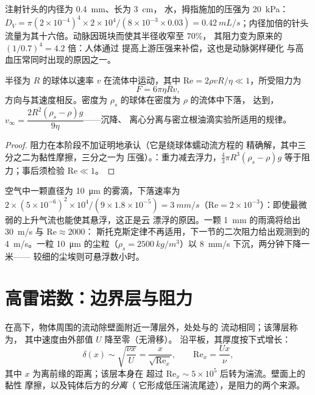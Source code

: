 \begin{example}[四次方]\label{ex:b2:viscous-flows:fourth}
注射针头的内径为 \qty{0.4}{mm}、长为 \qty{3}{cm}，
水，拇指施加的压强为 \qty{20}{kPa}：$D_V = \pi(2 \times 10^{-4})^4 \times 2 \times
10^4/(8 \times 10^{-3} \times 0.03) = \qty{0.42}{mL/s}$；内径加倍的针头
流量为其十六倍。动脉因斑块而使其半径收窄至 $70\%$，
其阻力变为原来的 $(1/0.7)^4 = 4.2$ 倍：人体通过
提高上游压强来补偿，这也是动脉粥样硬化
与高血压常同时出现的原因之一。
\end{example}

\begin{proposition}[斯托克斯阻力]\label{prop:b2:viscous-flows:stokes}
半径为 $R$ 的球体以速率 $v$ 在流体中运动，其中
$\mathrm{Re} = 2\rho vR/\eta \ll 1$，所受阻力为
\[
F = 6\pi\eta Rv ,
\]
方向与其速度相反。密度为 $\rho_s$ 的球体在密度为 $\rho$ 的流体中下落，
达到\emph{}，$v_\infty =
\dfrac{2R^2(\rho_s - \rho)g}{9\eta}$——沉降、
离心分离与密立根油滴实验所适用的规律。
\end{proposition}

\begin{proof}
阻力在本阶段不加证明地承认（它是绕球体蠕动流方程的
精确解，其中三分之二为黏性摩擦，三分之一为
压强）。：重力减去浮力，$\tfrac43\pi R^3(\rho_s -
\rho)g$ 等于阻力；事后须检验 $\mathrm{Re} \ll 1$。
\end{proof}

\begin{example}[雾、雨与尘埃]\label{ex:b2:viscous-flows:fog}
空气中一颗直径为 \qty{10}{\micro m} 的雾滴，下落速率为 $2 \times (5 \times
10^{-6})^2 \times 10^4/(9 \times 1.8 \times 10^{-5}) = \qty{3}{mm/s}$（$\mathrm{Re} = 2 \times
10^{-3}$）：即使最微弱的上升气流也能使其悬浮，这正是云
漂浮的原因。一颗 \qty{1}{mm} 的雨滴将给出 \qty{30}{m/s} 与 $\mathrm{Re} \approx 2000$：
斯托克斯定律不再适用，下一节的二次阻力给出观测到的
\qty{4}{m/s}。一粒 \qty{10}{\micro m} 的尘粒（$\rho_s =
\qty{2500}{kg/m^3}$）以 \qty{8}{mm/s} 下沉，两分钟下降一米——
较细的尘埃则可悬浮数小时。
\end{example}

\section{高雷诺数：边界层与阻力}

\begin{proposition}[边界层]\label{prop:b2:viscous-flows:bl}
在高下，物体周围的流动除壁面附近一薄层外，处处与的
流动相同；该薄层称为\emph{}，
其中速度由外部值 $U$ 降至零（无滑移）。
沿平板，其厚度按下式增长：
\[
\delta(x) \sim \sqrt{\frac{\nu x}{U}} = \frac{x}{\sqrt{\mathrm{Re}_x}} ,
\qquad \mathrm{Re}_x = \frac{Ux}{\nu} ,
\]
其中 $x$ 为离前缘的距离；该层本身在
超过 $\mathrm{Re}_x \sim 5 \times 10^5$ 后转为湍流。壁面上的黏性
摩擦，以及钝体后方的\emph{分离}（
它形成低压湍流尾迹），是阻力的两个来源。
\end{proposition}

